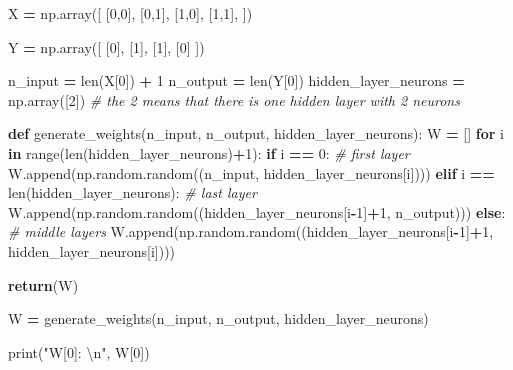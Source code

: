 \documentclass[
]{book}
\newenvironment{Shaded}{\begin{snugshade}}{\end{snugshade}}
\newcommand{\BuiltInTok}[1]{#1}
\newcommand{\CharTok}[1]{\textcolor[rgb]{0.31,0.60,0.02}{#1}}
\newcommand{\CommentTok}[1]{\textcolor[rgb]{0.56,0.35,0.01}{\textit{#1}}}
\newcommand{\ControlFlowTok}[1]{\textcolor[rgb]{0.13,0.29,0.53}{\textbf{#1}}}
\newcommand{\DecValTok}[1]{\textcolor[rgb]{0.00,0.00,0.81}{#1}}
\newcommand{\KeywordTok}[1]{\textcolor[rgb]{0.13,0.29,0.53}{\textbf{#1}}}
\newcommand{\NormalTok}[1]{#1}
\newcommand{\OperatorTok}[1]{\textcolor[rgb]{0.81,0.36,0.00}{\textbf{#1}}}
\newcommand{\StringTok}[1]{\textcolor[rgb]{0.31,0.60,0.02}{#1}}
\begin{document}
\begin{Shaded}
\begin{Highlighting}[]
\NormalTok{X }\OperatorTok{=}\NormalTok{ np.array([}
\NormalTok{  [}\DecValTok{0}\NormalTok{,}\DecValTok{0}\NormalTok{],}
\NormalTok{  [}\DecValTok{0}\NormalTok{,}\DecValTok{1}\NormalTok{],}
\NormalTok{  [}\DecValTok{1}\NormalTok{,}\DecValTok{0}\NormalTok{],}
\NormalTok{  [}\DecValTok{1}\NormalTok{,}\DecValTok{1}\NormalTok{],}
\NormalTok{]) }

\NormalTok{Y }\OperatorTok{=}\NormalTok{ np.array([}
\NormalTok{  [}\DecValTok{0}\NormalTok{],}
\NormalTok{  [}\DecValTok{1}\NormalTok{],}
\NormalTok{  [}\DecValTok{1}\NormalTok{],}
\NormalTok{  [}\DecValTok{0}\NormalTok{]}
\NormalTok{])}

\NormalTok{n\_input }\OperatorTok{=} \BuiltInTok{len}\NormalTok{(X[}\DecValTok{0}\NormalTok{]) }\OperatorTok{+} \DecValTok{1}
\NormalTok{n\_output }\OperatorTok{=} \BuiltInTok{len}\NormalTok{(Y[}\DecValTok{0}\NormalTok{])}
\NormalTok{hidden\_layer\_neurons }\OperatorTok{=}\NormalTok{ np.array([}\DecValTok{2}\NormalTok{]) }\CommentTok{\# the 2 means that there is one hidden layer with 2 neurons}

\KeywordTok{def}\NormalTok{ generate\_weights(n\_input, n\_output, hidden\_layer\_neurons):}
\NormalTok{  W }\OperatorTok{=}\NormalTok{ []}
  \ControlFlowTok{for}\NormalTok{ i }\KeywordTok{in} \BuiltInTok{range}\NormalTok{(}\BuiltInTok{len}\NormalTok{(hidden\_layer\_neurons)}\OperatorTok{+}\DecValTok{1}\NormalTok{):}
    \ControlFlowTok{if}\NormalTok{ i }\OperatorTok{==} \DecValTok{0}\NormalTok{: }\CommentTok{\# first layer}
\NormalTok{      W.append(np.random.random((n\_input, hidden\_layer\_neurons[i])))}
    \ControlFlowTok{elif}\NormalTok{ i }\OperatorTok{==} \BuiltInTok{len}\NormalTok{(hidden\_layer\_neurons): }\CommentTok{\# last layer}
\NormalTok{      W.append(np.random.random((hidden\_layer\_neurons[i}\OperatorTok{{-}}\DecValTok{1}\NormalTok{]}\OperatorTok{+}\DecValTok{1}\NormalTok{, n\_output)))}
    \ControlFlowTok{else}\NormalTok{: }\CommentTok{\# middle layers}
\NormalTok{      W.append(np.random.random((hidden\_layer\_neurons[i}\OperatorTok{{-}}\DecValTok{1}\NormalTok{]}\OperatorTok{+}\DecValTok{1}\NormalTok{, hidden\_layer\_neurons[i])))}
   
  \ControlFlowTok{return}\NormalTok{(W)}

\NormalTok{W }\OperatorTok{=}\NormalTok{ generate\_weights(n\_input, n\_output, hidden\_layer\_neurons)}

\BuiltInTok{print}\NormalTok{(}\StringTok{"W[0]: }\CharTok{\textbackslash{}n}\StringTok{"}\NormalTok{, W[}\DecValTok{0}\NormalTok{])}
\end{Highlighting}
\end{Shaded}
\end{document}
